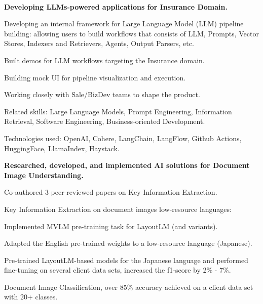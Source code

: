\\
\begin{xitemize}
    \item \textbf{Developing LLMs-powered applications for Insurance Domain.}
    \begin{zitemize}
        \item Developing an internal framework for Large Language Model (LLM) pipeline building: allowing
        users to build workflows that consists of LLM, Prompts, Vector Stores, Indexers and Retrievers,
        Agents, Output Parsers, etc.
        \item Built demos for LLM workflows targeting the Insurance domain.
        \item Building mock UI for pipeline visualization and execution.
        \item Working closely with Sale/BizDev teams to shape the product.
        \item Related skills: Large Language Models, Prompt Engineering, Information Retrieval, Software
        Engineering, Business-oriented Development.
        \item Technologies used: OpenAI, Cohere, LangChain, LangFlow, Github Actions, HuggingFace, LlamaIndex, Haystack.
    \end{zitemize}
    \item \textbf{Researched, developed, and implemented AI solutions for Document Image Understanding.}
    \begin{zitemize}
        \item Co-authored  3 peer-reviewed papers on Key Information Extraction.
        \item Key Information Extraction on document images low-resource languages:
        \begin{zitemize}
            \item Implemented MVLM pre-training task for LayoutLM (and variants).
            \item Adapted the English pre-trained weights to a low-resource language (Japanese).
            \item Pre-trained LayoutLM-based models for the Japanese language and performed fine-tuning on several client data sets, increased the f1-score by 2\% - 7\%.
        \end{zitemize}
        \item Document Image Classification, over 85\% accuracy achieved on a client data set with 20+ classes.

\end{zitemize}
\end{xitemize}
